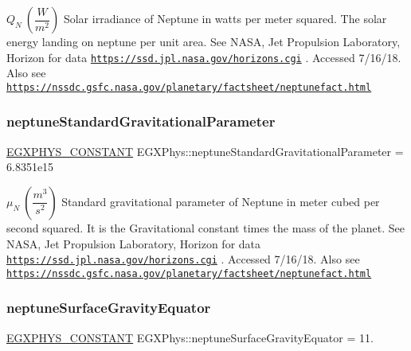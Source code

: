 $ Q_{N} \ (\dfrac{W}{m^2})$ Solar irradiance of Neptune in watts per meter squared. The solar energy landing on neptune per unit area. See N\+A\+SA, Jet Propulsion Laboratory, Horizon for data \href{https://ssd.jpl.nasa.gov/horizons.cgi}{\tt https\+://ssd.\+jpl.\+nasa.\+gov/horizons.\+cgi} . Accessed 7/16/18. Also see \href{https://nssdc.gsfc.nasa.gov/planetary/factsheet/neptunefact.html}{\tt https\+://nssdc.\+gsfc.\+nasa.\+gov/planetary/factsheet/neptunefact.\+html} \mbox{\label{group___e_g_x_phys-_constants-_astrophysics-_solar_system-_neptune-_bulk_ga7394cd8db6c84b691ab3921cafbc4923}} 
\subsubsection{\texorpdfstring{neptune\+Standard\+Gravitational\+Parameter}{neptuneStandardGravitationalParameter}}
{\footnotesize\ttfamily \mbox{\hyperlink{group___e_g_x_phys-_constants-_macros_ga76980d288494ce1714c9ac68a95ba702}{E\+G\+X\+P\+H\+Y\+S\+\_\+\+C\+O\+N\+S\+T\+A\+NT}} E\+G\+X\+Phys\+::neptune\+Standard\+Gravitational\+Parameter = 6.\+8351e15}

$ \mu_{N} \ (\dfrac{m^3}{s^2})$ Standard gravitational parameter of Neptune in meter cubed per second squared. It is the Gravitational constant times the mass of the planet. See N\+A\+SA, Jet Propulsion Laboratory, Horizon for data \href{https://ssd.jpl.nasa.gov/horizons.cgi}{\tt https\+://ssd.\+jpl.\+nasa.\+gov/horizons.\+cgi} . Accessed 7/16/18. Also see \href{https://nssdc.gsfc.nasa.gov/planetary/factsheet/neptunefact.html}{\tt https\+://nssdc.\+gsfc.\+nasa.\+gov/planetary/factsheet/neptunefact.\+html} \mbox{\label{group___e_g_x_phys-_constants-_astrophysics-_solar_system-_neptune-_bulk_ga16bd570f7267dfd97a2dcd7906f96056}} 
\subsubsection{\texorpdfstring{neptune\+Surface\+Gravity\+Equator}{neptuneSurfaceGravityEquator}}
{\footnotesize\ttfamily \mbox{\hyperlink{group___e_g_x_phys-_constants-_macros_ga76980d288494ce1714c9ac68a95ba702}{E\+G\+X\+P\+H\+Y\+S\+\_\+\+C\+O\+N\+S\+T\+A\+NT}} E\+G\+X\+Phys\+::neptune\+Surface\+Gravity\+Equator = 11.}

